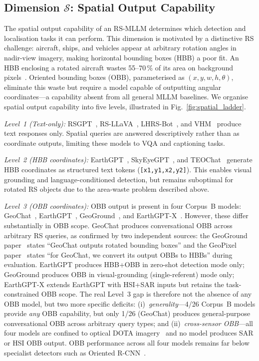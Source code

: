 \subsection{Dimension \texorpdfstring{$\mathcal{S}$}{S}: Spatial Output Capability}\label{sec3:spatial}

The spatial output capability of an RS-MLLM determines which detection and localisation
tasks it can perform. This dimension is motivated by a distinctive RS challenge:
aircraft, ships, and vehicles appear at arbitrary rotation angles in nadir-view imagery,
making horizontal bounding boxes (HBB) a poor fit. An HBB enclosing a rotated aircraft
wastes 55--70\,\% of its area on background pixels~\cite{xia2018dota}. Oriented
bounding boxes (OBB), parameterised as $(x, y, w, h, \theta)$, eliminate this waste but
require a model capable of outputting angular coordinates---a capability absent from all
general MLLM baselines. We organise spatial output capability into five levels,
illustrated in Fig.~\ref{fig:spatial_ladder}.

\textit{Level~1 (Text-only):} RSGPT~\cite{rsgpt2023}, RS-LLaVA~\cite{rsllava2024},
LHRS-Bot~\cite{lhrsbot2024}, and VHM~\cite{vhm2025} produce text responses only. Spatial
queries are answered descriptively rather than as coordinate outputs, limiting these
models to VQA and captioning tasks.

\textit{Level~2 (HBB coordinates):} EarthGPT~\cite{earthgpt2025},
SkyEyeGPT~\cite{skyeyegpt2025}, and TEOChat~\cite{teochat2025} generate HBB coordinates
as structured text tokens (\texttt{[x1,\;y1,\;x2,\;y2]}). This enables visual grounding
and language-conditioned detection, but remains suboptimal for rotated RS objects due to
the area-waste problem described above.

\textit{Level~3 (OBB coordinates):} OBB output is present in four Corpus~B
models: GeoChat~\cite{geochat2024}, EarthGPT~\cite{earthgpt2025},
GeoGround~\cite{geoground2025}, and EarthGPT-X~\cite{earthgptx2026}.
However, these differ substantially in OBB scope. GeoChat produces
conversational OBB across arbitrary RS queries, as confirmed by two
independent sources: the GeoGround paper~\cite{geoground2025} states
``GeoChat outputs rotated bounding boxes'' and the GeoPixel
paper~\cite{geopixel2025} states ``for GeoChat, we convert its output
OBBs to HBBs'' during evaluation.
EarthGPT produces HBB+OBB in zero-shot detection mode only;
GeoGround produces OBB in visual-grounding (single-referent) mode only;
EarthGPT-X extends EarthGPT with HSI+SAR inputs but retains the
task-constrained OBB scope.
The real Level~3 gap is therefore not the absence of any OBB model,
but two more specific deficits: (i)~\emph{generality}---4/26 Corpus~B
models provide \emph{any} OBB capability, but only 1/26 (GeoChat)
produces general-purpose conversational OBB across arbitrary query
types; and (ii)~\emph{cross-sensor OBB}---all four models are
confined to optical DOTA imagery~\cite{xia2018dota} and no model
produces SAR or HSI OBB output. OBB performance across all four
models remains far below specialist detectors such as Oriented
R-CNN~\cite{xie2021orientedrcnn}.

